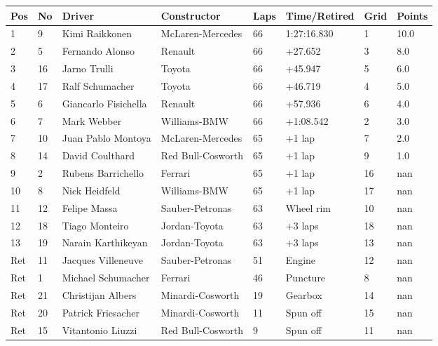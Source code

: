 \documentclass{article}
\begin{document}
\begin{tabular}{llllllll}
\toprule
Pos & No & Driver & Constructor & Laps & Time/Retired & Grid & Points \\
\midrule
1 & 9 & Kimi Raikkonen & McLaren-Mercedes & 66 & 1:27:16.830 & 1 & 10.0 \\
2 & 5 & Fernando Alonso & Renault & 66 & +27.652 & 3 & 8.0 \\
3 & 16 & Jarno Trulli & Toyota & 66 & +45.947 & 5 & 6.0 \\
4 & 17 & Ralf Schumacher & Toyota & 66 & +46.719 & 4 & 5.0 \\
5 & 6 & Giancarlo Fisichella & Renault & 66 & +57.936 & 6 & 4.0 \\
6 & 7 & Mark Webber & Williams-BMW & 66 & +1:08.542 & 2 & 3.0 \\
7 & 10 & Juan Pablo Montoya & McLaren-Mercedes & 65 & +1 lap & 7 & 2.0 \\
8 & 14 & David Coulthard & Red Bull-Cosworth & 65 & +1 lap & 9 & 1.0 \\
9 & 2 & Rubens Barrichello & Ferrari & 65 & +1 lap & 16 & nan \\
10 & 8 & Nick Heidfeld & Williams-BMW & 65 & +1 lap & 17 & nan \\
11 & 12 & Felipe Massa & Sauber-Petronas & 63 & Wheel rim & 10 & nan \\
12 & 18 & Tiago Monteiro & Jordan-Toyota & 63 & +3 laps & 18 & nan \\
13 & 19 & Narain Karthikeyan & Jordan-Toyota & 63 & +3 laps & 13 & nan \\
Ret & 11 & Jacques Villeneuve & Sauber-Petronas & 51 & Engine & 12 & nan \\
Ret & 1 & Michael Schumacher & Ferrari & 46 & Puncture & 8 & nan \\
Ret & 21 & Christijan Albers & Minardi-Cosworth & 19 & Gearbox & 14 & nan \\
Ret & 20 & Patrick Friesacher & Minardi-Cosworth & 11 & Spun off & 15 & nan \\
Ret & 15 & Vitantonio Liuzzi & Red Bull-Cosworth & 9 & Spun off & 11 & nan \\
\bottomrule
\end{tabular}
\end{document}
